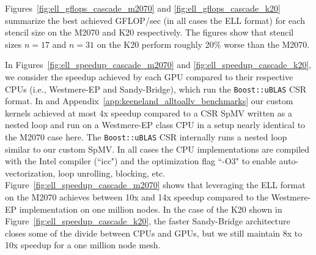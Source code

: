 \documentclass{report}
\begin{document}
Figures~\ref{fig:ell_gflops_cascade_m2070} and \ref{fig:ell_gflops_cascade_k20} summarize the best achieved GFLOP/sec (in all cases the ELL format) for each stencil size on the M2070 and K20 respectively. The figures show that stencil sizes $n=17$ and $n=31$ on the K20 perform roughly 20\% worse than the M2070. 

In Figures~\ref{fig:ell_speedup_cascade_m2070} and \ref{fig:ell_speedup_cascade_k20}, we consider the speedup achieved by each GPU compared to their respective CPUs (i.e., Westmere-EP and Sandy-Bridge), which run the \texttt{Boost::uBLAS} CSR format. In \cite{BolligFlyerErlebacher2012} and Appendix~\ref{app:keeneland_alltoallv_benchmarks} our custom kernels achieved at most 4x speedup compared to a CSR SpMV written as a nested loop and run on a Westmere-EP class CPU in a setup nearly identical to the M2070 case here. The \texttt{Boost::uBLAS} CSR internally runs a nested loop similar to our custom SpMV. In all cases the CPU implementations are compiled with the Intel compiler (``icc") and the optimization flag ``-O3" to enable auto-vectorization, loop unrolling, blocking, etc. 
Figure~\ref{fig:ell_speedup_cascade_m2070} shows that leveraging the ELL format on the M2070 achieves between 10x and 14x speedup compared to the Westmere-EP implementation on one million nodes. In the case of the K20 shown in Figure~\ref{fig:ell_speedup_cascade_k20}, the faster Sandy-Bridge architecture closes some of the divide between CPUs and GPUs, but we still maintain 8x to 10x speedup for a one million node mesh.
\end{document}
